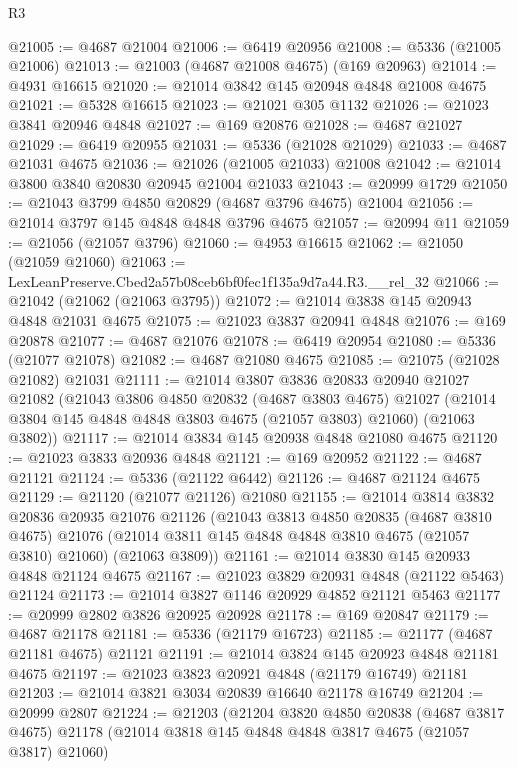 \begin{lexlean}{R3}
\begin{coremodule}
@21005 := @4687 @21004
@21006 := @6419 @20956
@21008 := @5336 (@21005 @21006)
@21013 := @21003 (@4687 @21008 @4675) (@169 @20963)
@21014 := @4931 @16615
@21020 := @21014 @3842 @145 @20948 @4848 @21008 @4675
@21021 := @5328 @16615
@21023 := @21021 @305 @1132
@21026 := @21023 @3841 @20946 @4848
@21027 := @169 @20876
@21028 := @4687 @21027
@21029 := @6419 @20955
@21031 := @5336 (@21028 @21029)
@21033 := @4687 @21031 @4675
@21036 := @21026 (@21005 @21033) @21008
@21042 := @21014 @3800 @3840 @20830 @20945 @21004 @21033
@21043 := @20999 @1729
@21050 := @21043 @3799 @4850 @20829 (@4687 @3796 @4675) @21004
@21056 := @21014 @3797 @145 @4848 @4848 @3796 @4675
@21057 := @20994 @11
@21059 := @21056 (@21057 @3796)
@21060 := @4953 @16615
@21062 := @21050 (@21059 @21060)
@21063 := LexLeanPreserve.Cbed2a57b08ceb6bf0fec1f135a9d7a44.R3.__rel_32
@21066 := @21042 (@21062 (@21063 @3795))
@21072 := @21014 @3838 @145 @20943 @4848 @21031 @4675
@21075 := @21023 @3837 @20941 @4848
@21076 := @169 @20878
@21077 := @4687 @21076
@21078 := @6419 @20954
@21080 := @5336 (@21077 @21078)
@21082 := @4687 @21080 @4675
@21085 := @21075 (@21028 @21082) @21031
@21111 := @21014
    @3807
    @3836
    @20833
    @20940
    @21027
    @21082
    (@21043
      @3806
      @4850
      @20832
      (@4687 @3803 @4675)
      @21027
      (@21014 @3804 @145 @4848 @4848 @3803 @4675 (@21057 @3803) @21060)
      (@21063 @3802))
@21117 := @21014 @3834 @145 @20938 @4848 @21080 @4675
@21120 := @21023 @3833 @20936 @4848
@21121 := @169 @20952
@21122 := @4687 @21121
@21124 := @5336 (@21122 @6442)
@21126 := @4687 @21124 @4675
@21129 := @21120 (@21077 @21126) @21080
@21155 := @21014
    @3814
    @3832
    @20836
    @20935
    @21076
    @21126
    (@21043
      @3813
      @4850
      @20835
      (@4687 @3810 @4675)
      @21076
      (@21014 @3811 @145 @4848 @4848 @3810 @4675 (@21057 @3810) @21060)
      (@21063 @3809))
@21161 := @21014 @3830 @145 @20933 @4848 @21124 @4675
@21167 := @21023 @3829 @20931 @4848 (@21122 @5463) @21124
@21173 := @21014 @3827 @1146 @20929 @4852 @21121 @5463
@21177 := @20999 @2802 @3826 @20925 @20928
@21178 := @169 @20847
@21179 := @4687 @21178
@21181 := @5336 (@21179 @16723)
@21185 := @21177 (@4687 @21181 @4675) @21121
@21191 := @21014 @3824 @145 @20923 @4848 @21181 @4675
@21197 := @21023 @3823 @20921 @4848 (@21179 @16749) @21181
@21203 := @21014 @3821 @3034 @20839 @16640 @21178 @16749
@21204 := @20999 @2807
@21224 := @21203
    (@21204
      @3820
      @4850
      @20838
      (@4687 @3817 @4675)
      @21178
      (@21014 @3818 @145 @4848 @4848 @3817 @4675 (@21057 @3817) @21060)

\end{coremodule}
\end{lexlean}
